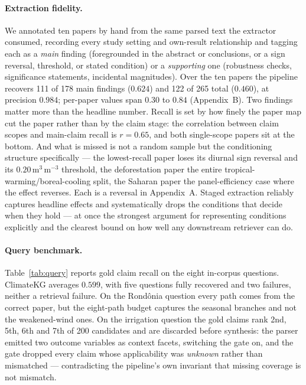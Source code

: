 \documentclass{article}
\begin{document}
\paragraph{Extraction fidelity.}
We annotated ten papers by hand from the same parsed text the extractor consumed,
recording every study setting and own-result relationship and tagging each as a
\emph{main} finding (foregrounded in the abstract or conclusions, or a sign reversal,
threshold, or stated condition) or a \emph{supporting} one (robustness checks,
significance statements, incidental magnitudes). Over the ten papers the pipeline
recovers 111 of 178 main findings ($0.624$) and 122 of 265 total ($0.460$), at
precision $0.984$; per-paper values span $0.30$ to $0.84$ (Appendix~B). Two findings
matter more than the headline number. Recall is set by how finely the paper map cut the
paper rather than by the claim stage: the correlation between claim scopes and
main-claim recall is $r=0.65$, and both single-scope papers sit at the bottom. And what
is missed is not a random sample but the conditioning structure specifically --- the
lowest-recall paper loses its diurnal sign reversal and its
$0.20$\,m$^3$\,m$^{-3}$ threshold, the deforestation paper the entire
tropical-warming/boreal-cooling split, the Saharan paper the panel-efficiency case where
the effect reverses. Each is a reversal in Appendix~A. Staged extraction reliably
captures headline effects and systematically drops the conditions that decide when they
hold --- at once the strongest argument for representing conditions explicitly and the
clearest bound on how well any downstream retriever can do.

\paragraph{Query benchmark.}
Table~\ref{tab:query} reports gold claim recall on the eight in-corpus questions.
ClimateKG averages $0.599$, with five questions fully recovered and two failures,
neither a retrieval failure. On the Rond\^onia question every path comes from the correct
paper, but the eight-path budget captures the seasonal branches and not the
weakened-wind ones. On the irrigation question the gold claims rank
2nd, 5th, 6th and 7th of 200 candidates and are discarded before synthesis: the parser
emitted two outcome variables as context facets, switching the gate on, and the gate
dropped every claim whose applicability was \emph{unknown} rather than mismatched ---
contradicting the pipeline's own invariant that missing coverage is not mismatch.
\end{document}
